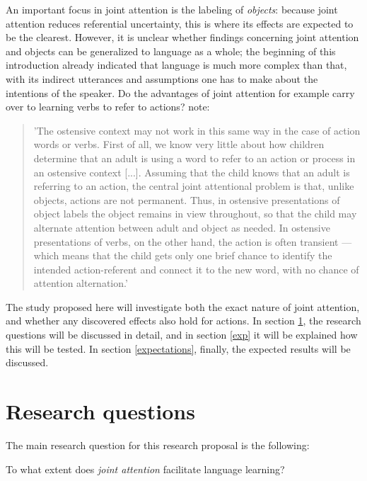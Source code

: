 \documentclass[12pt]{article}
\let\stdsection\section
\renewcommand\section{\newpage\stdsection}
\begin{document}
An important focus in joint attention is the labeling of \emph{objects}: because joint attention reduces referential uncertainty, this is where its effects are expected to be the clearest. However, it is unclear whether findings concerning joint attention and objects can be generalized to language as a whole; the beginning of this introduction already indicated that language is much more complex than that, with its indirect utterances and assumptions one has to make about the intentions of the speaker. Do the advantages of joint attention for example carry over to learning verbs to refer to actions? \citet[pp. 312-313]{tk92} note: 

\begin{quote}
'The ostensive context may not work in this same way in the case of action words or verbs. First of all, we know very little about how children determine that an adult is using a word to refer to an action or process in an ostensive context [...]. Assuming that the child knows that an adult is referring to an action, the central joint attentional problem is that, unlike objects, actions are not permanent. Thus, in ostensive presentations of object labels the object remains in view throughout, so that the child may alternate attention between adult and object as needed. In ostensive presentations of verbs, on the other hand, the action is often transient — which means that the child gets only one brief chance to identify the intended action-referent and connect it to the new word, with no chance of attention alternation.'
\end{quote}

The study proposed here will investigate both the exact nature of joint attention, and whether any discovered effects also hold for actions. In section \ref{rq}, the research questions will be discussed in detail, and in section \ref{exp} it will be explained how this will be tested. In section \ref{expectations}, finally, the expected results will be discussed.

\section{Research questions} \label{rq}

The main research question for this research proposal is the following:

\begin{examples}
\item To what extent does \emph{joint attention} facilitate language learning?
\end{examples}
\end{document}
